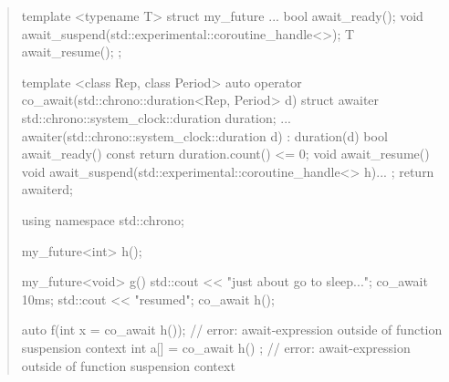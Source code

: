 \begin{quote}
\begin{itemize}
\end{itemize}

\pnum
\enterexample
\begin{codeblock}	
template <typename T>
struct my_future {
  ...
  bool await_ready();
  void await_suspend(std::experimental::coroutine_handle<>);
  T await_resume();
};
  
template <class Rep, class Period>
auto operator co_await(std::chrono::duration<Rep, Period> d) {
  struct awaiter {
    std::chrono::system_clock::duration duration;
    ...
    awaiter(std::chrono::system_clock::duration d) : duration(d){}
    bool await_ready() const { return duration.count() <= 0; }
    void await_resume() {}
    void await_suspend(std::experimental::coroutine_handle<> h){...}
  };
  return awaiter{d};
}

using namespace std::chrono;

my_future<int> h();

my_future<void> g() {
  std::cout << "just about go to sleep...\n";
  co_await 10ms;
  std::cout << "resumed\n";
  co_await h();
}

auto f(int x = co_await h()); // error: await-expression outside of function suspension context
int a[] = { co_await h() }; // error: await-expression outside of function suspension context

\end{codeblock}
\exitexample%

\end{quote}
%
%
%
%
%
%
